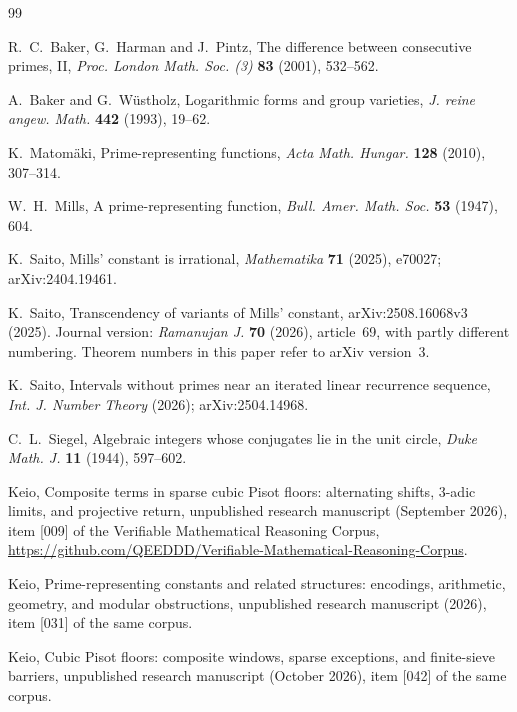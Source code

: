 \documentclass[11pt,a4paper]{article}
\theoremstyle{definition}
\theoremstyle{remark}
\begin{document}
\begin{thebibliography}{99}

R.~C.~Baker, G.~Harman and J.~Pintz, The difference between consecutive primes, II, \emph{Proc. London Math. Soc. (3)} \textbf{83} (2001), 532--562.

A.~Baker and G.~W\"ustholz, Logarithmic forms and group varieties, \emph{J. reine angew. Math.} \textbf{442} (1993), 19--62.

K.~Matom\"aki, Prime-representing functions, \emph{Acta Math. Hungar.} \textbf{128} (2010), 307--314.

W.~H.~Mills, A prime-representing function, \emph{Bull. Amer. Math. Soc.} \textbf{53} (1947), 604.

K.~Saito, Mills' constant is irrational, \emph{Mathematika} \textbf{71} (2025), e70027; arXiv:2404.19461.

K.~Saito, Transcendency of variants of Mills' constant, arXiv:2508.16068v3 (2025). Journal version: \emph{Ramanujan J.} \textbf{70} (2026), article~69, with partly different numbering. Theorem numbers in this paper refer to arXiv version~3.

K.~Saito, Intervals without primes near an iterated linear recurrence sequence, \emph{Int. J. Number Theory} (2026); arXiv:2504.14968.

C.~L.~Siegel, Algebraic integers whose conjugates lie in the unit circle, \emph{Duke Math. J.} \textbf{11} (1944), 597--602.

Keio, Composite terms in sparse cubic Pisot floors: alternating shifts, $3$-adic limits, and projective return, unpublished research manuscript (September 2026), item [009] of the Verifiable Mathematical Reasoning Corpus, \url{https://github.com/QEEDDD/Verifiable-Mathematical-Reasoning-Corpus}.

Keio, Prime-representing constants and related structures: encodings, arithmetic, geometry, and modular obstructions, unpublished research manuscript (2026), item [031] of the same corpus.

Keio, Cubic Pisot floors: composite windows, sparse exceptions, and finite-sieve barriers, unpublished research manuscript (October 2026), item [042] of the same corpus.

\end{thebibliography}
\end{document}
